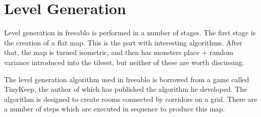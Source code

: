 \newpage
	
\section{Level Generation}
    Level generation in freeablo is performed in a number of stages. The first stage is the creation of a flat map. This is the part with interesting algorithms.
    After that, the map is turned isometric, and then has monsters place + random variance introduced into the tileset, but neither of these are worth discussing.

    \mbox{}

    The level generation algorithm used in freeablo is borrowed from a game called TinyKeep\cite{tinykeep}, the author of which has published the algorithm he developed\cite{tinygen}.
    The algorithm is designed to create rooms connected by corridors on a grid.
    There are a number of steps which are executed in sequence to produce this map.
